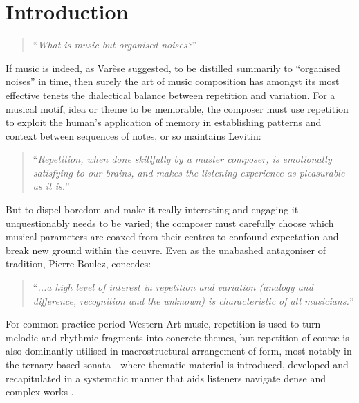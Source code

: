 
\chapter{Introduction}
\label{chap:intro}

\blockcquote[]{Varese1966}{``\textit{What is music but organised noises?}''}

If music is indeed, as Varèse suggested, to be distilled summarily to “organised noises” in time, then surely the art of music composition has amongst its most effective tenets the dialectical balance between repetition and variation. For a musical motif, idea or theme to be memorable, the composer must use repetition to exploit the human's application of memory in establishing patterns and context between sequences of notes, or so maintains Levitin:

\blockcquote[]{Levitin}{``\textit{Repetition, when done skillfully by a master composer, is emotionally satisfying to our brains, and makes the listening experience as pleasurable as it is.}''}

But to dispel boredom and make it really interesting and engaging it unquestionably needs to be varied; the composer must carefully choose which musical parameters are coaxed from their centres to confound expectation and break new ground within the oeuvre. Even as the unabashed antagoniser of tradition, Pierre Boulez, concedes:

\blockcquote[]{Campbell1997}{``\textit{...a high level of interest in repetition and variation (analogy and difference, recognition and the unknown) is characteristic of all musicians.}''} 

For common practice period Western Art music, repetition is used to turn melodic and rhythmic fragments into concrete themes, but repetition of course is also dominantly utilised in macrostructural arrangement of form, most notably in the ternary-based sonata - where thematic material is introduced, developed and recapitulated in a systematic manner that aids listeners navigate dense and complex works \citep{Benward2008}.

